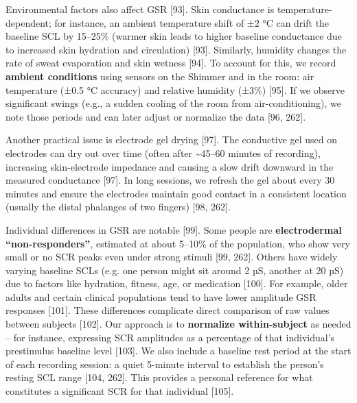 \documentclass{article}
\begin{document}
    Environmental factors also affect GSR [93]. Skin conductance is temperature-dependent; for instance, an ambient temperature shift of ±2 °C can drift the baseline SCL by 15–25\% (warmer skin leads to higher baseline conductance due to increased skin hydration and circulation) [93]. Similarly, humidity changes the rate of sweat evaporation and skin wetness [94]. To account for this, we record \textbf{ambient conditions} using sensors on the Shimmer and in the room: air temperature (±0.5 °C accuracy) and relative humidity (±3\%) [95]. If we observe significant swings (e.g., a sudden cooling of the room from air-conditioning), we note those periods and can later adjust or normalize the data [96, 262].

    Another practical issue is electrode gel drying [97]. The conductive gel used on electrodes can dry out over time (often after \textasciitilde45–60 minutes of recording), increasing skin-electrode impedance and causing a slow drift downward in the measured conductance [97]. In long sessions, we refresh the gel about every 30 minutes and ensure the electrodes maintain good contact in a consistent location (usually the distal phalanges of two fingers) [98, 262].

    Individual differences in GSR are notable [99]. Some people are \textbf{electrodermal “non-responders”}, estimated at about 5–10\% of the population, who show very small or no SCR peaks even under strong stimuli [99, 262]. Others have widely varying baseline SCLs (e.g. one person might sit around 2 µS, another at 20 µS) due to factors like hydration, fitness, age, or medication [100]. For example, older adults and certain clinical populations tend to have lower amplitude GSR responses [101]. These differences complicate direct comparison of raw values between subjects [102]. Our approach is to \textbf{normalize within-subject} as needed – for instance, expressing SCR amplitudes as a percentage of that individual’s prestimulus baseline level [103]. We also include a baseline rest period at the start of each recording session: a quiet 5-minute interval to establish the person’s resting SCL range [104, 262]. This provides a personal reference for what constitutes a significant SCR for that individual [105].
\end{document}
